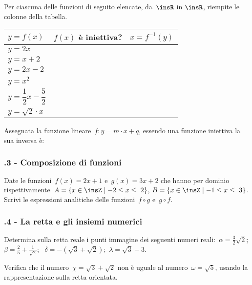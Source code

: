 \begin{esercizio}
 \label{ese:D.12}
Per ciascuna delle funzioni di seguito elencate, da~$\insR$ in $\insR$, riempite le colonne della tabella.
\begin{center}
\begin{tabular}{l*2{c}}
\toprule
$y=f(x)$ & $f(x)$ è iniettiva? & $x=f^{-1}(y)$\\
\midrule
$y=2x$ & & \\
$y=x+2$ & & \\
$y=2x-2$ & & \\
$y=x^{2}$ & & \\
$y=\dfrac{1}{2}x-\dfrac{5}{2}$ & & \\
$y=\sqrt{2}\cdot x$ & & \\
\bottomrule
\end{tabular}
\end{center}
\end{esercizio}

\begin{esercizio}
 \label{ese:D.13}
Assegnata la funzione lineare~$f:y=m\cdot x+q$, essendo una funzione
iniettiva la sua inversa è:\dotfill
\end{esercizio}

\subsubsection*{\thechapter.3 - Composizione di funzioni}
\begin{esercizio}
 \label{ese:D.14}
Date le funzioni~$f(x)=2x+1$ e~$g(x)=3x+2$ che hanno per dominio
rispettivamente~$A=\left\{x\in \insZ\mid -2\le x\le~2\right\}$,
$B=\left\{x\in \insZ\mid -1\le x\le~3\right\}$.
Scrivi le espressioni analitiche delle funzioni~$f\circ g$ e~$g\circ f$.
\end{esercizio}

\subsubsection*{\thechapter.4 - La retta e gli insiemi numerici}

\begin{esercizio}
\label{ese:D.15}
Determina sulla retta reale i punti immagine dei seguenti numeri reali:~$\alpha =\frac{3}{2}\sqrt{2}$;\, $\beta =\frac{2}{5}+\frac{1}{\sqrt{2}}$;
\, $\delta =-\left(\sqrt{3}+\sqrt{2}\right)$;\, $\lambda =\sqrt{3}-3$.
\end{esercizio}

\begin{esercizio}
\label{ese:D.16}
Verifica che il numero~$\chi =\sqrt{3}+\sqrt{2}$ non è uguale al numero~$\omega =\sqrt{5}$, usando la rappresentazione sulla retta orientata.
\end{esercizio}

